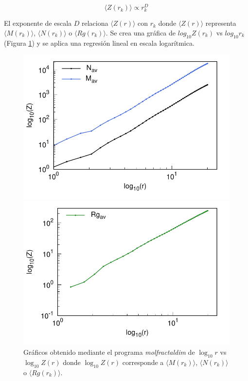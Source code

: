  	\begin{equation}
 		\langle Z(r_{k}) \rangle \propto r^{D}_{k}
 		\label{leyp2}
 	\end{equation}
 	
 	El exponente de escala $D$ relaciona $\langle Z(r) \rangle$ 
 	con $r_{k}$ donde $\langle Z(r) \rangle$ representa $\langle M(r_k) \rangle$,
 	 $\langle N(r_k) \rangle$ o $\langle Rg(r_k) \rangle$. 
 	Se crea una gr\'{a}fica de $log_{10}Z(r_k)$ vs $log_{10}r_{k}$ 
 	(Figura \ref{fig:GrafD}) y se aplica una 
 	regresi\'{o}n lineal en escala logar\'{i}tmica.
 	
	\begin{figure}[H]
		\hspace{-0.3cm} 
		\begin{minipage}{0.49\textwidth}
			\centering
			\includegraphics[width=\linewidth]{graphs/molmass/Zvsr.pdf}
		\end{minipage}
		\hspace{0.2cm}
		\begin{minipage}{0.49\textwidth}
			\centering
			\includegraphics[width=\linewidth]{graphs/molmass/Zvsr-Rg.pdf}
		\end{minipage}
		
		\caption{
			Gr\'{a}ficos obtenido mediante el programa \textit{molfractaldim} de $\log_{10}r$ vs $\log_{10}Z(r)$ donde $\log_{10}Z(r)$ 
			corresponde a $\langle M(r_k) \rangle$, $\langle N(r_k) \rangle$ 
			o $\langle Rg(r_k) \rangle$. }
		\label{fig:GrafD}
	\end{figure}


